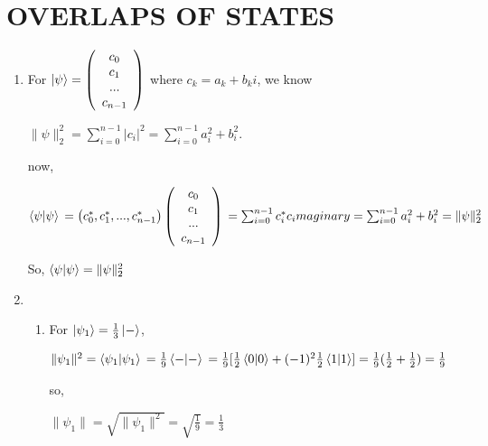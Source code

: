 \documentclass{article}
\begin{document}
\section*{OVERLAPS OF STATES}
\begin{enumerate}
    \item For $\ket{\psi}=\left(\begin{array}{c}
                      c_0 \\c_1\\...\\c_{n-1}
                  \end{array}\right)$
          where $c_k=a_k+b_ki$,
          we know

          $\lVert\psi\rVert^2_2 = \sum_{i=0}^{n-1}|c_i|^2=\sum_{i=0}^{n-1}a_i^2+b_i^2$.

          now,


          $\braket{\psi|\psi}
              \\=\left(c_0^*,c_1^*,...,c_{n-1}^*\right)\left(\begin{array}{c}
                      c_0 \\c_1\\...\\c_{n-1}
                  \end{array}\right)
              \\=\sum_{i=0}^{n-1}c_i^*c_imaginary
              \\=\sum_{i=0}^{n-1}a_i^2+b_i^2
              \\=\lVert\psi\rVert^2_2
          $

          So, $\braket{\psi|\psi}=\lVert\psi\rVert^2_2$
    \item
          \begin{enumerate}
              \item For $\ket{\psi_1}=\frac{1}{3}\ket{-}$,

                    $\lVert\psi_1\rVert^2
                        \\=\braket{\psi_1|\psi_1}
                        \\=\frac{1}{9}\braket{-|-}
                        \\=\frac{1}{9}[\frac{1}{2}\braket{0|0}+(-1)^2\frac{1}{2}\braket{1|1}]
                        \\=\frac{1}{9}(\frac{1}{2}+\frac{1}{2})
                        \\=\frac{1}{9}$

                    so,

                    $\lVert\psi_1\rVert=\sqrt{\lVert\psi_1\rVert^2}=\sqrt{\frac{1}{9}}=\frac{1}{3}$


\end{enumerate}
\end{enumerate}
\end{document}
